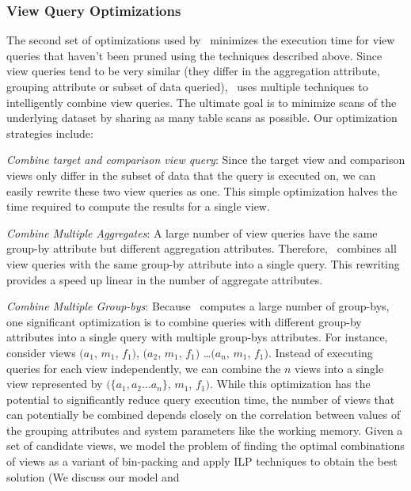 \subsubsection{View Query Optimizations}
\label{subsubsec:optimizations}

The second set of optimizations used by \SeeDB\ minimizes the execution time for
view queries that haven't been pruned using the techniques described above.
Since view queries tend to be very similar (they differ in the aggregation
attribute, grouping attribute or subset of data queried), \SeeDB\ uses multiple
techniques to intelligently combine view queries.
The ultimate goal is to minimize scans of the underlying dataset by sharing as
many table scans as possible. Our optimization strategies include:

\begin{denselist}
  \item {\it Combine target and comparison view query}: Since the target view
  and comparison views only differ in the subset of data that the query is
  executed on, we can easily rewrite these two view queries as one.
  This simple optimization halves the time required to compute the results for
  a single view.
  \item {\it Combine Multiple Aggregates}: A large number of view
  queries have the same group-by attribute but different aggregation attributes.
  Therefore, \SeeDB\ combines all view queries with the same group-by attribute
  into a single query. This rewriting provides a speed up linear in the
  number of aggregate attributes.
  \item {\it Combine Multiple Group-bys}: 
  Because \SeeDB\ computes a large number of group-bys, one significant
  optimization is to combine queries with different
  group-by attributes into a single query with multiple group-bys attributes.
  For instance, consider views $(a_1$, $m_1$, $f_1)$, $(a_2$, $m_1$, $f_1)$
  \ldots $(a_n$, $m_1$, $f_1)$. Instead of executing queries for each view
  independently, we can combine the $n$ views into a single view represented by
  $(\{a_1, a_2\ldots a_n\}$, $m_1$, $f_1)$. 
  While this optimization has the potential to significantly reduce query
  execution time, the number of views that can potentially be combined depends
  closely on the correlation between values of the grouping attributes and system parameters like the
  working memory. Given a set of candidate views, we model the problem of
  finding the optimal combinations of views as a variant of bin-packing and
  apply ILP techniques to obtain the best solution (We discuss our model and

\end{denselist}
